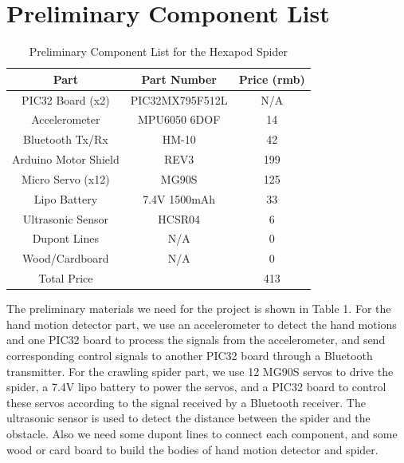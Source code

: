 \documentclass[a4paper]{article}
\begin{document}
\section{Preliminary Component List}

\begin{table}[htbp]
    \centering
    \begin{tabular}{ccc}    
        \toprule    
            Part & Part Number & Price (rmb) \\    
        \midrule
            PIC32 Board   (x2)     & PIC32MX795F512L      & N/A    \\
            Accelerometer          & MPU6050 6DOF         & 14     \\
            Bluetooth   Tx/Rx      & HM-10                & 42     \\
            Arduino Motor   Shield & REV3                 & 199    \\
            Micro Servo   (x12)    & MG90S                & 125    \\
            Lipo Battery           & 7.4V 1500mAh         & 33     \\
            Ultrasonic Sensor      & HCSR04               & 6      \\
            Dupont Lines           & N/A                  & 0      \\
            Wood/Cardboard         & N/A                  & 0      \\  
        \bottomrule
            Total Price  &  & 413  \\  
    \end{tabular}
    \caption{Preliminary Component List for the Hexapod Spider}  
\end{table}

The preliminary materials we need for the project is shown in Table 1. For the hand motion detector part, we use an accelerometer to detect the hand motions and one PIC32 board to process the signals from the accelerometer, and send corresponding control signals to another PIC32 board through a Bluetooth transmitter. For the crawling spider part, we use 12 MG90S servos to drive the spider, a 7.4V lipo battery to power the servos, and a PIC32 board to control these servos according to the signal received by a Bluetooth receiver. The ultrasonic sensor is used to detect the distance between the spider and the obstacle. Also we need some dupont lines to connect each component, and some wood or card board to build the bodies of hand motion detector and spider.
\end{document}
